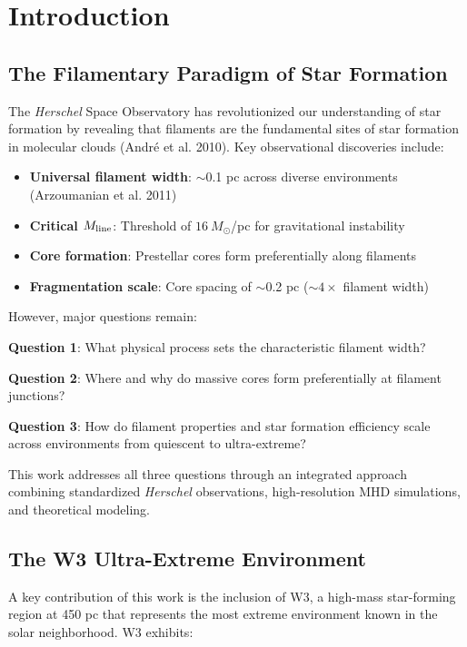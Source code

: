 \documentclass[11pt,a4paper]{article}
\begin{document}
\tableofcontents

\section{Introduction}

\subsection{The Filamentary Paradigm of Star Formation}

The \textit{Herschel} Space Observatory has revolutionized our understanding of star formation by revealing that filaments are the fundamental sites of star formation in molecular clouds (Andr\'e et al. 2010). Key observational discoveries include:

\begin{itemize}
    \item \textbf{Universal filament width}: $\sim$0.1 pc across diverse environments (Arzoumanian et al. 2011)
    \item \textbf{Critical $M_{\rm line}$}: Threshold of $16~M_\odot$/pc for gravitational instability
    \item \textbf{Core formation}: Prestellar cores form preferentially along filaments
    \item \textbf{Fragmentation scale}: Core spacing of $\sim$0.2 pc ($\sim 4\times$ filament width)
\end{itemize}

However, major questions remain:

\textbf{Question 1}: What physical process sets the characteristic filament width?

\textbf{Question 2}: Where and why do massive cores form preferentially at filament junctions?

\textbf{Question 3}: How do filament properties and star formation efficiency scale across environments from quiescent to ultra-extreme?

This work addresses all three questions through an integrated approach combining standardized \textit{Herschel} observations, high-resolution MHD simulations, and theoretical modeling.

\subsection{The W3 Ultra-Extreme Environment}

A key contribution of this work is the inclusion of W3, a high-mass star-forming region at 450 pc that represents the most extreme environment known in the solar neighborhood. W3 exhibits:
\end{document}
